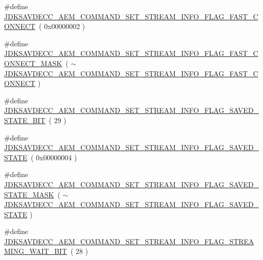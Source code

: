 \begin{DoxyCompactItemize}
\item 
\#define \hyperlink{group__command__set__stream__info_gacee797af4dd20da0a0912695fe18ef9c}{J\+D\+K\+S\+A\+V\+D\+E\+C\+C\+\_\+\+A\+E\+M\+\_\+\+C\+O\+M\+M\+A\+N\+D\+\_\+\+S\+E\+T\+\_\+\+S\+T\+R\+E\+A\+M\+\_\+\+I\+N\+F\+O\+\_\+\+F\+L\+A\+G\+\_\+\+F\+A\+S\+T\+\_\+\+C\+O\+N\+N\+E\+CT}~( 0x00000002 )
\item 
\#define \hyperlink{group__command__set__stream__info_ga8d0d4076e5479a6b771baa01abdfe0bf}{J\+D\+K\+S\+A\+V\+D\+E\+C\+C\+\_\+\+A\+E\+M\+\_\+\+C\+O\+M\+M\+A\+N\+D\+\_\+\+S\+E\+T\+\_\+\+S\+T\+R\+E\+A\+M\+\_\+\+I\+N\+F\+O\+\_\+\+F\+L\+A\+G\+\_\+\+F\+A\+S\+T\+\_\+\+C\+O\+N\+N\+E\+C\+T\+\_\+\+M\+A\+SK}~( $\sim$\hyperlink{group__command__set__stream__info_gacee797af4dd20da0a0912695fe18ef9c}{J\+D\+K\+S\+A\+V\+D\+E\+C\+C\+\_\+\+A\+E\+M\+\_\+\+C\+O\+M\+M\+A\+N\+D\+\_\+\+S\+E\+T\+\_\+\+S\+T\+R\+E\+A\+M\+\_\+\+I\+N\+F\+O\+\_\+\+F\+L\+A\+G\+\_\+\+F\+A\+S\+T\+\_\+\+C\+O\+N\+N\+E\+CT} )
\item 
\#define \hyperlink{group__command__set__stream__info_ga84744a30d1c59e5973e8afd4d5b8e46e}{J\+D\+K\+S\+A\+V\+D\+E\+C\+C\+\_\+\+A\+E\+M\+\_\+\+C\+O\+M\+M\+A\+N\+D\+\_\+\+S\+E\+T\+\_\+\+S\+T\+R\+E\+A\+M\+\_\+\+I\+N\+F\+O\+\_\+\+F\+L\+A\+G\+\_\+\+S\+A\+V\+E\+D\+\_\+\+S\+T\+A\+T\+E\+\_\+\+B\+IT}~( 29 )
\item 
\#define \hyperlink{group__command__set__stream__info_gad640286e76933182ae38245d88f7ad95}{J\+D\+K\+S\+A\+V\+D\+E\+C\+C\+\_\+\+A\+E\+M\+\_\+\+C\+O\+M\+M\+A\+N\+D\+\_\+\+S\+E\+T\+\_\+\+S\+T\+R\+E\+A\+M\+\_\+\+I\+N\+F\+O\+\_\+\+F\+L\+A\+G\+\_\+\+S\+A\+V\+E\+D\+\_\+\+S\+T\+A\+TE}~( 0x00000004 )
\item 
\#define \hyperlink{group__command__set__stream__info_ga96558ff60ff8b5173bf4ecf70169c323}{J\+D\+K\+S\+A\+V\+D\+E\+C\+C\+\_\+\+A\+E\+M\+\_\+\+C\+O\+M\+M\+A\+N\+D\+\_\+\+S\+E\+T\+\_\+\+S\+T\+R\+E\+A\+M\+\_\+\+I\+N\+F\+O\+\_\+\+F\+L\+A\+G\+\_\+\+S\+A\+V\+E\+D\+\_\+\+S\+T\+A\+T\+E\+\_\+\+M\+A\+SK}~( $\sim$\hyperlink{group__command__set__stream__info_gad640286e76933182ae38245d88f7ad95}{J\+D\+K\+S\+A\+V\+D\+E\+C\+C\+\_\+\+A\+E\+M\+\_\+\+C\+O\+M\+M\+A\+N\+D\+\_\+\+S\+E\+T\+\_\+\+S\+T\+R\+E\+A\+M\+\_\+\+I\+N\+F\+O\+\_\+\+F\+L\+A\+G\+\_\+\+S\+A\+V\+E\+D\+\_\+\+S\+T\+A\+TE} )
\item 
\#define \hyperlink{group__command__set__stream__info_ga41fb810ca1c1e291688497a8e2dd7a64}{J\+D\+K\+S\+A\+V\+D\+E\+C\+C\+\_\+\+A\+E\+M\+\_\+\+C\+O\+M\+M\+A\+N\+D\+\_\+\+S\+E\+T\+\_\+\+S\+T\+R\+E\+A\+M\+\_\+\+I\+N\+F\+O\+\_\+\+F\+L\+A\+G\+\_\+\+S\+T\+R\+E\+A\+M\+I\+N\+G\+\_\+\+W\+A\+I\+T\+\_\+\+B\+IT}~( 28 )

\end{DoxyCompactItemize}
